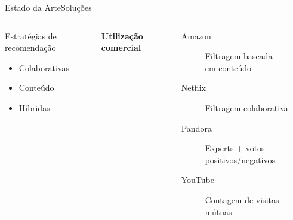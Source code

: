 \begin{frame}{Estado da Arte}{Soluções}
\begin{columns}[c]
\begin{block}{Estratégias de recomendação}
\begin{itemize}
	\item Colaborativas
	\item Conteúdo
	\item Híbridas
\end{itemize}
\end{block}





\textbf{Utilização comercial} \\ \cite{chiang2012networked}

\begin{description}
\item[Amazon] Filtragem baseada \\ em conteúdo
\item[Netflix] Filtragem colaborativa
\item[Pandora] Experts + votos positivos/negativos
\item[YouTube] Contagem de visitas mútuas
\end{description}
\end{columns}
\end{frame}


